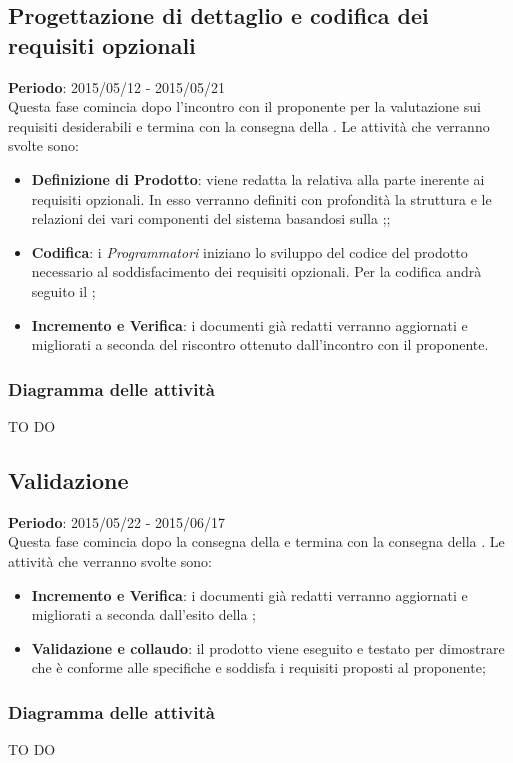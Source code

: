 	\subsection{Progettazione di dettaglio e codifica dei requisiti opzionali} %
	\label{sub:progettazione_di_dettaglio_e_codifica_dei_requisiti_opzionali}
	\textbf{Periodo}:  2015/05/12 - 2015/05/21 \\
	Questa fase comincia dopo l'incontro con il proponente per la valutazione sui requisiti desiderabili e termina con la consegna della \RQ.
	Le attività che verranno svolte sono:
		\begin{itemize}
			\item \textbf{Definizione di Prodotto}: viene redatta la \docNameVersionDdP{} relativa alla parte inerente ai requisiti opzionali. In esso verranno definiti con profondità la struttura e le relazioni dei vari componenti del sistema basandosi sulla \docNameVersionST;;
			\item \textbf{Codifica}: i \emph{Programmatori} iniziano lo sviluppo del codice del prodotto necessario al soddisfacimento dei requisiti opzionali. Per la codifica andrà seguito il \docNameVersionDdP;
			\item \textbf{Incremento e Verifica}: i documenti già redatti verranno aggiornati e migliorati a seconda del riscontro ottenuto dall'incontro con il proponente.
		\end{itemize}
			
		\subsubsection{Diagramma delle attività} %
		\label{ssub:diagramma_delle_attivita}
		TO DO
	
	\subsection{Validazione} %
	\label{sub:validazione}
	\textbf{Periodo}:  2015/05/22 - 2015/06/17 \\
	Questa fase comincia dopo la consegna della \RQ{} e termina con la consegna della \RA.
	Le attività che verranno svolte sono:
		\begin{itemize}
			\item \textbf{Incremento e Verifica}: i documenti già redatti verranno aggiornati e migliorati a seconda dall'esito della \RQ;
			\item \textbf{Validazione e collaudo}: il prodotto viene eseguito e testato per dimostrare che è conforme alle specifiche e soddisfa i requisiti proposti al proponente;
		\end{itemize}
		
		\subsubsection{Diagramma delle attività} %
		\label{ssub:diagramma_delle_attivita}
		TO DO
	
	
